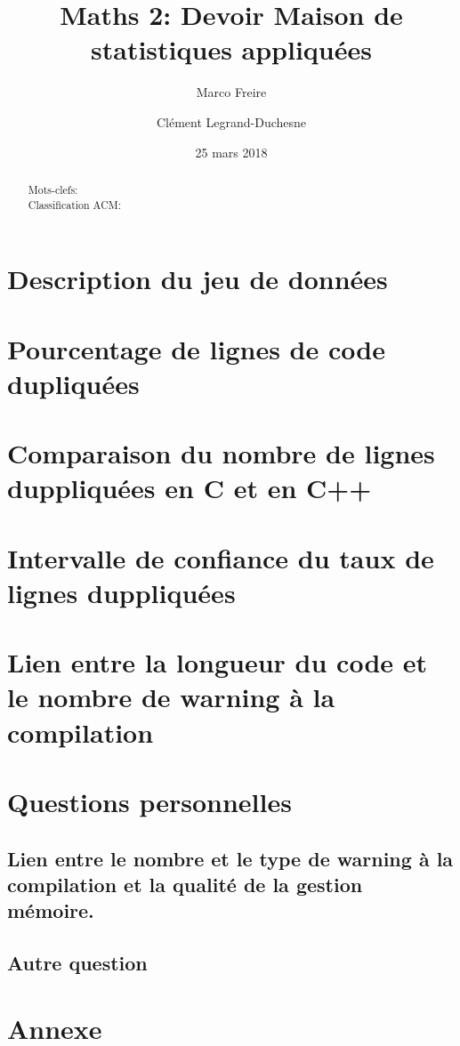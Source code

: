 \documentclass[a4paper,11pt]{article}%
\begin{document}
\title{Maths 2: Devoir Maison de statistiques appliquées}

\author{Marco Freire \and Clément Legrand-Duchesne}

\date{25 mars 2018}

\maketitle

\begin{abstract}
  
  \begin{description}
    
  \item[Mots-clefs:] 
      
  \item[Classification ACM:] 
  \end{description}
\end{abstract}

\renewcommand{\contentsname}{Plan}
\tableofcontents

\section{Description du jeu de données}


\section{Pourcentage de lignes de code dupliquées}


\section{Comparaison du nombre de lignes duppliquées en C et en C++}


\section{Intervalle de confiance du taux de lignes duppliquées}


\section{Lien entre la longueur du code et le nombre de warning à la
  compilation}


\section{Questions personnelles}
\subsection{Lien entre le nombre et le type de warning à la
  compilation et la qualité de la gestion mémoire.}

\subsection{Autre question}


\section*{Annexe}

\end{document}
